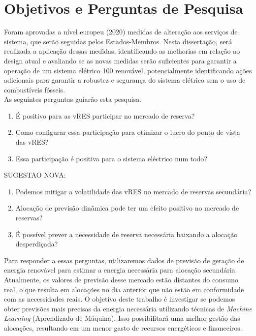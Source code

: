 \section{Objetivos e Perguntas de Pesquisa\label{se:objetivos}}

Foram aprovadas a nível europeu (2020) medidas de alteração aos serviços de sistema, que serão seguidas pelos Estados-Membros. Nesta dissertação, será realizada a aplicação dessas medidas, identificando as melhorias em relação ao design atual e avaliando se as novas medidas serão suficientes para garantir a operação de um sistema elétrico 100 renovável, potencialmente identificando ações adicionais para garantir a robustez e segurança do sistema elétrico sem o uso de combustíveis fósseis. \\

As seguintes perguntas guiarão esta pesquisa.\\

\begin{enumerate}[label=\alph*)]
  \item É positivo para as vRES participar no mercado de reserva?
  \item Como configurar essa participação para otimizar o lucro do ponto de vista das vRES?
  \item Essa participação é positiva para o sistema eléctrico num todo?
\end{enumerate}

SUGESTAO NOVA:
\begin{enumerate}[label=\alph*)]
  \item Podemos mitigar a volatilidade das vRES no mercado de reservas secundária?
  \item Alocação de previsão dinâmica pode ter um efeito positivo no mercado de reservas?
  \item É possível prever a necessidade de reserva necessária baixando a alocação desperdiçada?
\end{enumerate}

Para responder a essas perguntas, utilizaremos dados de previsão de geração de energia renovável para estimar a energia necessária para alocação secundária. Atualmente, os valores de previsão desse mercado estão distantes do consumo real, o que resulta em alocações no dia anterior que não estão em conformidade com as necessidades reais. O objetivo deste trabalho é investigar se podemos obter previsões mais precisas da energia necessária utilizando técnicas de \textit{Machine Learning} (Aprendizado de Máquina). Isso possibilitará uma melhor gestão das alocações, resultando em um menor gasto de recursos energéticos e financeiros.

